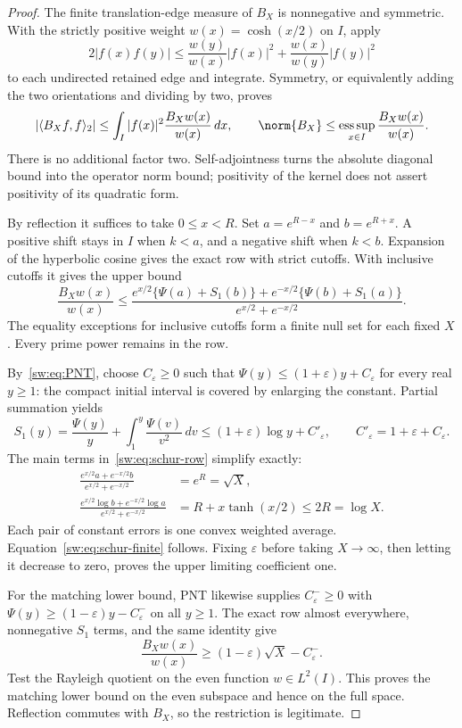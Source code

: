 \documentclass[11pt,a4paper]{article}
\numberwithin{equation}{section}
\theoremstyle{definition}\newtheorem{definition}[theorem]{Definition}
\theoremstyle{remark}\newtheorem{remark}[theorem]{Remark}
\begin{document}
\begin{proof}
The finite translation-edge measure of $B_X$ is nonnegative and symmetric. With the strictly positive weight $w(x)=\cosh(x/2)$ on $I$, apply
\[
 2|f(x)f(y)|\le\frac{w(y)}{w(x)}|f(x)|^2
                    +\frac{w(x)}{w(y)}|f(y)|^2
\]
to each undirected retained edge and integrate. Symmetry, or equivalently adding the two orientations and dividing by two, proves
\begin{equation}\label{sw:eq:atomic-schur}
 |\langle B_Xf,f\rangle_2|
 \le\int_I|f(x)|^2\frac{B_Xw(x)}{w(x)}\,dx,
 \qquad \norm{B_X}\le\mathop{\rm ess\,sup}_{x\in I}\frac{B_Xw(x)}{w(x)}.
\end{equation}
There is no additional factor two. Self-adjointness turns the absolute diagonal bound into the operator norm bound; positivity of the kernel does not assert positivity of its quadratic form.

By reflection it suffices to take $0\le x<R$. Set $a=e^{R-x}$ and $b=e^{R+x}$. A positive shift stays in $I$ when $k<a$, and a negative shift when $k<b$. Expansion of the hyperbolic cosine gives the exact row with strict cutoffs. With inclusive cutoffs it gives the upper bound
\begin{equation}\label{sw:eq:schur-row}
 \frac{B_Xw(x)}{w(x)}\le
 \frac{e^{x/2}\{\Psi(a)+S_1(b)\}
       +e^{-x/2}\{\Psi(b)+S_1(a)\}}
      {e^{x/2}+e^{-x/2}}.
\end{equation}
The equality exceptions for inclusive cutoffs form a finite null set for each fixed $X$. Every prime power remains in the row.

By~\eqref{sw:eq:PNT}, choose $C_\varepsilon\ge0$ such that
$\Psi(y)\le(1+\varepsilon)y+C_\varepsilon$ for every real $y\ge1$: the compact initial interval is covered by enlarging the constant. Partial summation yields
\[
 S_1(y)=\frac{\Psi(y)}y+\int_1^y\frac{\Psi(v)}{v^2}\,dv
 \le(1+\varepsilon)\log y+C'_\varepsilon,
 \qquad C'_\varepsilon=1+\varepsilon+C_\varepsilon.
\]
The main terms in~\eqref{sw:eq:schur-row} simplify exactly:
\begin{align*}
 \frac{e^{x/2}a+e^{-x/2}b}{e^{x/2}+e^{-x/2}}&=e^R=\sqrt X,\\
 \frac{e^{x/2}\log b+e^{-x/2}\log a}{e^{x/2}+e^{-x/2}}
 &=R+x\tanh(x/2)\le2R=\log X.
\end{align*}
Each pair of constant errors is one convex weighted average. Equation~\eqref{sw:eq:schur-finite} follows. Fixing $\varepsilon$ before taking $X\to\infty$, then letting it decrease to zero, proves the upper limiting coefficient one.

For the matching lower bound, PNT likewise supplies $C^-_\varepsilon\ge0$ with $\Psi(y)\ge(1-\varepsilon)y-C^-_\varepsilon$ on all $y\ge1$. The exact row almost everywhere, nonnegative $S_1$ terms, and the same identity give
\[
 \frac{B_Xw(x)}{w(x)}\ge(1-\varepsilon)\sqrt X-C^-_\varepsilon.
\]
Test the Rayleigh quotient on the even function $w\in L^2(I)$. This proves the matching lower bound on the even subspace and hence on the full space. Reflection commutes with $B_X$, so the restriction is legitimate.
\end{proof}
\end{document}
